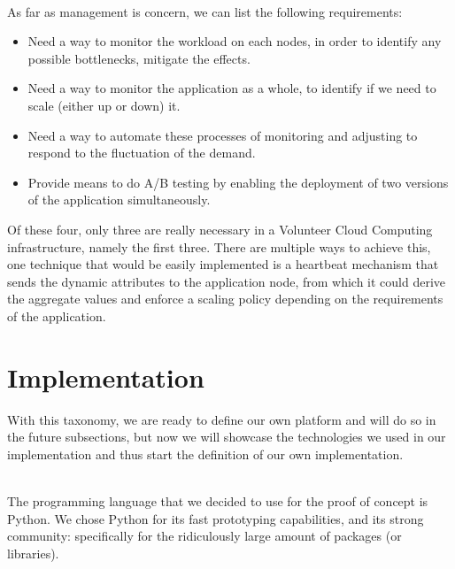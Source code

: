 \documentclass[11pt]{amsart}
\begin{document}
\begin{enumarate}
          \\ As far as management is concern, we can list the following requirements:
          \begin{itemize}
          \item Need a way to monitor the workload on each nodes, in order to identify any
            possible bottlenecks, mitigate the effects.
          \item Need a way to monitor the application as a whole, to identify if we need
            to scale (either up or down) it.
          \item Need a way to automate these processes of monitoring and adjusting to
            respond to the fluctuation of the demand.
          \item Provide means to do A/B testing by enabling the deployment of two versions
            of the application simultaneously.
          \end{itemize}
          Of these four, only three are really necessary in a Volunteer Cloud Computing
          infrastructure, namely the first three. There are multiple ways to achieve this,
          one technique that would be easily implemented is a heartbeat mechanism that
          sends the dynamic attributes to the application node, from which it could derive
          the aggregate values and enforce a scaling policy depending on the requirements
          of the application.

          \section{Implementation}
          With this taxonomy, we are ready to define our own platform and will do so in
          the future subsections, but now we will showcase the technologies we used in our
          implementation and thus start the definition of our own implementation.
          
          \\ The programming language that we decided to use for the proof of concept is
          Python. We chose Python for its fast prototyping capabilities, and its strong
          community: specifically for the ridiculously large amount of packages (or
          libraries). 


\end{enumarate}
\end{document}
